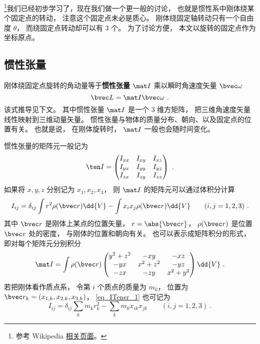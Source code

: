 
\begin{issues}
\issueTODO
\end{issues}


\footnote{参考 Wikipedia \href{https://en.wikipedia.org/wiki/Moment_of_inertia}{相关页面}。}我们已经初步学习了，现在我们做一个更一般的讨论， 也就是惯性系中刚体绕某个固定点的转动， 注意这个固定点未必是质心。 刚体绕固定轴转动只有一个自由度 $\theta$， 而绕固定点转动却可以有 3 个。 为了讨论方便， 本文以旋转的固定点作为坐标原点。

\subsection{惯性张量}
刚体绕固定点旋转的角动量等于\textbf{惯性张量} $\mat I$ 乘以瞬时角速度矢量 $\bvec \omega$
\begin{equation}\label{eq_ITensr_3}
\bvec L = \mat I \bvec \omega~.
\end{equation}
该式推导见下文。 其中惯性张量 $\mat I$ 是一个 3 维方矩阵， 把三维角速度矢量线性映射到三维动量矢量。 惯性张量与物体的质量分布、朝向、以及固定点的位置有关。 也就是说， 在刚体旋转时， $\mat I$ 一般也会随时间变化。

惯性张量的矩阵元一般记为
\begin{equation}
\ten I = \begin{pmatrix}
I_{xx}& I_{xy}& I_{xz} \\
I_{yx}& I_{yy}& I_{yz} \\
I_{zx}& I_{zy}& I_{zz}
\end{pmatrix}~.
\end{equation}
如果将 $x, y, z$ 分别记为 $x_1, x_2, x_3$， 则 $\mat I$ 的矩阵元可以通过体积分计算
\begin{equation}\label{eq_ITensr_1}
I_{ij} = \delta_{ij} \int r^2 \rho(\bvec r)\dd{V} - \int x_i x_j \rho(\bvec r)\dd{V} \qquad (i, j = 1, 2, 3)~.
\end{equation}
其中 $\bvec r$ 是刚体上某点的位置矢量， $r = \abs{\bvec r}$， $\rho(\bvec r)$ 是位置 $\bvec r$ 处的密度， 与刚体的位置和朝向有关。 也可以表示成矩阵积分的形式， 即对每个矩阵元分别积分
\begin{equation}\label{eq_ITensr_2}
\mat I = \int \rho(\bvec r)
\begin{pmatrix}
y^2 + z^2 & -xy & -xz\\
-yx & x^2 + z^2 & -yz\\
-zx & -zy & x^2 + y^2
\end{pmatrix}
\dd{V}~.
\end{equation}
若把刚体看作质点系， 令第 $i$ 个质点的质量为 $m_k$， 位置为 $\bvec r_{k} = (x_{1,k},x_{2,k},x_{3,k})$， \autoref{eq_ITensr_1} 也可记为
\begin{equation}\label{eq_ITensr_8}
I_{ij} = \delta_{ij}\sum_k m_k r_k^2 - \sum_k m_k x_{ik}x_{jk} \qquad (i, j = 1, 2, 3)~.
\end{equation}

